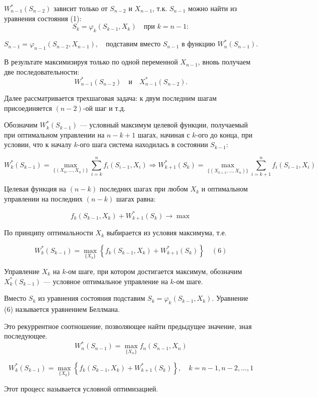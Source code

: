 \documentclass[17pt]{extarticle}
\begin{document}
\( W_{n-1}^*(S_{n-2}) \) зависит только от \( S_{n-2} \) и \( X_{n-1} \), т.к. \( S_{n-1} \) можно найти из уравнения состояния (1):
\[
    S_k = \varphi_k(S_{k-1}, X_k) \quad \text{при } k = n-1:
\]

\[
    S_{n-1} = \varphi_{n-1}(S_{n-2}, X_{n-1}), \quad \text{подставим вместо } S_{n-1} \text{ в функцию } W_n^*(S_{n-1}).
\]

В результате максимизируя только по одной переменной \( X_{n-1} \), вновь получаем две последовательности:
\[
    W_{n-1}^*(S_{n-2}) \quad \text{и} \quad X_{n-1}^*(S_{n-2}).
\]

Далее рассматривается трехшаговая задача: к двум последним шагам присоединяется \( (n-2) \)-ой шаг и т.д.

Обозначим \( W_k^*(S_{k-1}) \) — условный максимум целевой функции,
получаемый при оптимальном управлении на \( n - k + 1 \) шагах, начиная с \( k \)-ого до конца, при условии,
что к началу \( k \)-ого шага система находилась в состоянии \( S_{k-1} \):

\[
    W_k^*(S_{k-1}) = \max_{\{(X_k, \ldots, X_n)\}} \sum_{i=k}^n f_i(S_{i-1}, X_i) \Rightarrow W_{k+1}^*(S_k) = \max_{\{(X_{k+1}, \ldots, X_n)\}} \sum_{i=k+1}^n f_i(S_{i-1}, X_i)
\]

Целевая функция на \( (n - k) \) последних шагах при любом \( X_k \) и оптимальном управлении на последних \( (n - k) \) шагах равна:

\[
    f_k(S_{k-1}, X_k) + W_{k+1}^*(S_k) \rightarrow \max
\]

По принципу оптимальности \( X_k \) выбирается из условия максимума, т.е.

\[
    W_k^*(S_{k-1}) = \max_{\{X_k\}} \left\{ f_k(S_{k-1}, X_k) + W_{k+1}^*(S_k) \right\} \quad (6)
\]

Управление \( X_k \) на \( k \)-ом шаге, при котором достигается максимум,
обозначим \( X_k^*(S_{k-1}) \) — условное оптимальное управление на \( k \)-ом шаге.

Вместо \( S_k \) из уравнения состояния подставим \( S_k = \varphi_k(S_{k-1}, X_k) \).
Уравнение (6) называется уравнением Беллмана.

Это рекуррентное соотношение, позволяющее найти предыдущее значение, зная последующее.
\[
    W_n^*(S_{n-1}) = \max_{\{X_n\}} f_n(S_{n-1}, X_n)
\]

\[
    W_k^*(S_{k-1}) = \max_{\{X_k\}} \left\{ f_k(S_{k-1}, X_k) + W_{k+1}^*(S_k) \right\}, \quad k = n-1, n-2, \ldots, 1
\]

Этот процесс называется условной оптимизацией.
\end{document}
